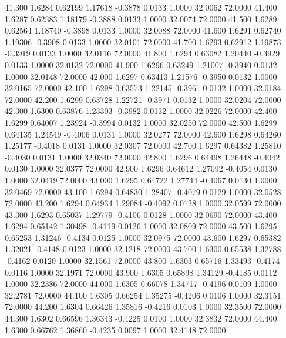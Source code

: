   41.300   1.6284   0.62199   1.17618  -0.3878   0.0133   1.0000  32.0062  72.0000
  41.400   1.6287   0.62383   1.18179  -0.3888   0.0133   1.0000  32.0074  72.0000
  41.500   1.6289   0.62564   1.18740  -0.3898   0.0133   1.0000  32.0088  72.0000
  41.600   1.6291   0.62740   1.19306  -0.3908   0.0133   1.0000  32.0101  72.0000
  41.700   1.6293   0.62912   1.19873  -0.3919   0.0133   1.0000  32.0116  72.0000
  41.800   1.6294   0.63082   1.20440  -0.3929   0.0133   1.0000  32.0132  72.0000
  41.900   1.6296   0.63249   1.21007  -0.3940   0.0132   1.0000  32.0148  72.0000
  42.000   1.6297   0.63413   1.21576  -0.3950   0.0132   1.0000  32.0165  72.0000
  42.100   1.6298   0.63573   1.22145  -0.3961   0.0132   1.0000  32.0184  72.0000
  42.200   1.6299   0.63728   1.22721  -0.3971   0.0132   1.0000  32.0204  72.0000
  42.300   1.6300   0.63876   1.23303  -0.3982   0.0132   1.0000  32.0226  72.0000
  42.400   1.6299   0.64007   1.23924  -0.3994   0.0132   1.0000  32.0250  72.0000
  42.500   1.6299   0.64135   1.24549  -0.4006   0.0131   1.0000  32.0277  72.0000
  42.600   1.6298   0.64260   1.25177  -0.4018   0.0131   1.0000  32.0307  72.0000
  42.700   1.6297   0.64382   1.25810  -0.4030   0.0131   1.0000  32.0340  72.0000
  42.800   1.6296   0.64498   1.26448  -0.4042   0.0130   1.0000  32.0377  72.0000
  42.900   1.6296   0.64612   1.27092  -0.4054   0.0130   1.0000  32.0419  72.0000
  43.000   1.6295   0.64722   1.27744  -0.4067   0.0130   1.0000  32.0469  72.0000
  43.100   1.6294   0.64830   1.28407  -0.4079   0.0129   1.0000  32.0528  72.0000
  43.200   1.6294   0.64934   1.29084  -0.4092   0.0128   1.0000  32.0599  72.0000
  43.300   1.6293   0.65037   1.29779  -0.4106   0.0128   1.0000  32.0690  72.0000
  43.400   1.6294   0.65142   1.30498  -0.4119   0.0126   1.0000  32.0809  72.0000
  43.500   1.6295   0.65253   1.31246  -0.4134   0.0125   1.0000  32.0975  72.0000
  43.600   1.6297   0.65382   1.32021  -0.4148   0.0123   1.0000  32.1218  72.0000
  43.700   1.6300   0.65538   1.32788  -0.4162   0.0120   1.0000  32.1561  72.0000
  43.800   1.6303   0.65716   1.33493  -0.4174   0.0116   1.0000  32.1971  72.0000
  43.900   1.6305   0.65898   1.34129  -0.4185   0.0112   1.0000  32.2386  72.0000
  44.000   1.6305   0.66078   1.34717  -0.4196   0.0109   1.0000  32.2781  72.0000
  44.100   1.6305   0.66254   1.35275  -0.4206   0.0106   1.0000  32.3151  72.0000
  44.200   1.6304   0.66426   1.35816  -0.4216   0.0103   1.0000  32.3500  72.0000
  44.300   1.6302   0.66596   1.36343  -0.4225   0.0100   1.0000  32.3832  72.0000
  44.400   1.6300   0.66762   1.36860  -0.4235   0.0097   1.0000  32.4148  72.0000
